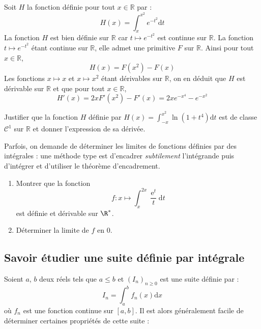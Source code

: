 \documentclass[french,11pt,twoside]{VcCours}
\newcommand{\dx}{\text{d}x}
\newcommand{\dt}{\text{d}t}
\DeclareMathOperator{\e}{e}
\begin{document}
\medskip

\begin{Exemple} Soit $H$ la fonction définie pour tout $x \in \mathbb{R}$ par :
$$ H(x) = \int_{x}^{x^2} e^{-t^2} \dt$$
La fonction $H$ est bien définie sur $\mathbb{R}$ car $t \mapsto e^{-t^2}$ est continue sur $\mathbb{R}$. La fonction $t \mapsto e^{-t^2}$ étant continue sur $\mathbb{R}$, elle admet une primitive $F$ sur $\mathbb{R}$. Ainsi pour tout $x \in \mathbb{R}$,
$$ H(x) = F(x^2)-F(x)$$
Les fonctions $x \mapsto x$ et $x \mapsto x^2$ étant dérivables sur $\mathbb{R}$, on en déduit que $H$ est dérivable sur $\mathbb{R}$ et que pour tout $x \in \mathbb{R}$,
$$ H'(x) = 2x F'(x^2)-F'(x) = 2x e^{-x^4}-e^{-x^2}$$
\end{Exemple}

\begin{ApplicationDirecte}{} Justifier que la fonction $H$ définie par $H(x) = \int_{-x}^{x^2} \ln(1+t^4) \dt$ est de classe $\mathcal{C}^1$ sur $\mathbb{R}$ et donner l'expression de sa dérivée.
\end{ApplicationDirecte}

Parfois, on demande de déterminer les limites de fonctions définies par des intégrales : une méthode type est d'encadrer \textit{subtilement} l'intégrande puis d'intégrer et d'utiliser le théorème d'encadrement.

\begin{ApplicationDirecte}{}
\begin{enumerate}
  \item
    Montrer que la fonction
    \[
    f : x \mapsto \int_{x}^{2x} \frac{\e^{t}}{t} \dt
    \]
    est définie et dérivable sur $\R^{*}$.
  \item
    Déterminer la limite de $f$ en 0.
  \end{enumerate}
\end{ApplicationDirecte}


\subsection{Savoir étudier une suite définie par intégrale}
Soient $a$, $b$ deux réels tels que $a \leq b$ et $(I_n)_{n \geq 0}$ est une suite définie par :
$$ I_n = \int_{a}^b f_n(x) \dx$$
où $f_n$ est une fonction continue sur $[a,b]$. Il est alors généralement facile de déterminer certaines propriétés de cette suite :

\medskip
\end{document}
